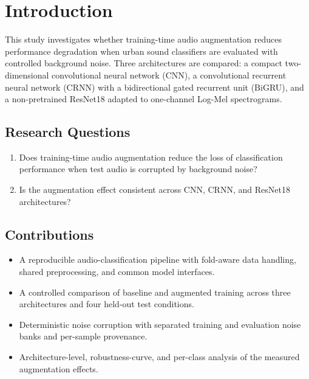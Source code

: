 \section{Introduction}


This study investigates whether training-time audio augmentation reduces
performance degradation when urban sound classifiers are evaluated with
controlled background noise. Three architectures are compared: a compact
two-dimensional convolutional neural network (CNN), a convolutional recurrent
neural network (CRNN) with a bidirectional gated recurrent unit (BiGRU), and a
non-pretrained ResNet18 adapted to one-channel Log-Mel spectrograms.

\subsection{Research Questions}

\begin{enumerate}
  \item Does training-time audio augmentation reduce the loss of classification
  performance when test audio is corrupted by background noise?
  \item Is the augmentation effect consistent across CNN, CRNN, and ResNet18
  architectures?
\end{enumerate}

\subsection{Contributions}


\begin{itemize}
  \item A reproducible audio-classification pipeline with fold-aware data
  handling, shared preprocessing, and common model interfaces.
  \item A controlled comparison of baseline and augmented training across three
  architectures and four held-out test conditions.
  \item Deterministic noise corruption with separated training and evaluation
  noise banks and per-sample provenance.
  \item Architecture-level, robustness-curve, and per-class analysis of the
  measured augmentation effects.
\end{itemize}
